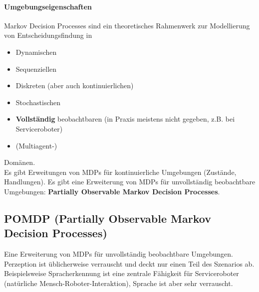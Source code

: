 \paragraph{Umgebungseigenschaften}
Markov Decision Processes sind ein theoretisches Rahmenwerk zur Modellierung von Entscheidungsfindung in
\begin{itemize}
	\item Dynamischen
	\item Sequenziellen
	\item Diskreten (aber auch kontinuierlichen)
	\item Stochastischen
	\item \textbf{Vollst\"andig} beobachtbaren (in Praxis meistens nicht gegeben, z.B. bei Serviceroboter)
	\item (Multiagent-)
\end{itemize}
Domänen.\\
Es gibt Erweitungen von MDPs für kontinuierliche Umgebungen (Zustände, Handlungen). Es gibt eine Erweiterung von MDPs für unvollständig beobachtbare Umgebungen: \textbf{Partially Observable Markov
Decision Processes}.

\subsection{POMDP (Partially Observable Markov Decision Processes)}
Eine Erweiterung von MDPs f\"ur unvollst\"andig beobachtbare Umgebungen. Perzeption ist \"ublicherweise verrauscht und deckt nur einen Teil des Szenarios ab. Beispielsweise Spracherkennung ist eine zentrale Fähigkeit für Serviceroboter (natürliche Mensch-Roboter-Interaktion), Sprache ist aber sehr verrauscht.

